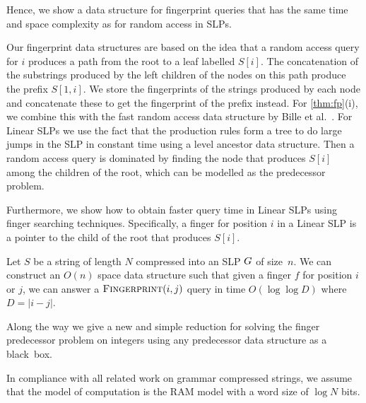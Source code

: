 \noindent Hence, we show a data structure for fingerprint queries that has the same time and space complexity as for random access in SLPs. 

Our fingerprint data structures are based on the idea that a random access query for $i$ produces a path from the root to a leaf labelled $S[i]$. The concatenation of the substrings produced by the left children of the nodes on this path produce the prefix $S[1,i]$. We store the fingerprints of the strings produced by each node and concatenate these to get the fingerprint of the prefix instead. For \autoref{thm:fp}(i), we combine this with the fast random access data structure by Bille et al.~\cite{bille2011random}. For Linear SLPs we use the fact that the production rules form a tree to do large jumps in the SLP in constant time using a level ancestor data structure. Then a random access query is dominated by finding the node that produces $S[i]$ among the children of the root, which can be modelled as the predecessor problem.

Furthermore, we show how to obtain faster query time in Linear SLPs using finger searching techniques. Specifically, a finger for position $i$ in a Linear SLP is a pointer to the child of the root that produces $S[i]$.


\begin{theorem}\label{thm:ffp}
Let $S$ be a string of length $N$ compressed into an SLP $G$ of size~$n$. We can construct an $O(n)$ space data structure such that given a finger $f$ for position $i$ or $j$, we can answer a $\textsc{Fingerprint}(i, j)$ query in time $O(\log \log D)$ where $D = |i - j|$.
\end{theorem}

\noindent Along the way we give a new and simple reduction for solving the finger predecessor problem on integers using any predecessor data structure as a black~box.





In compliance with all related work on grammar compressed strings, we assume that the model of computation is the RAM model with a word size of $\log N$ bits.

